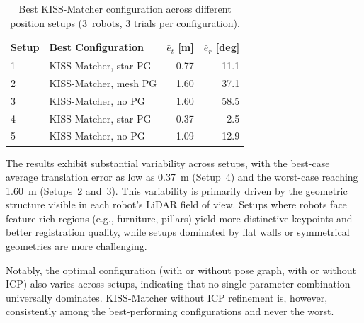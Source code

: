 \begin{table}[htbp]
    \centering
    \caption{Best KISS-Matcher configuration across different position
             setups (3~robots, 3 trials per configuration).}
    \label{tab:cross_setup}
    \begin{tabular}{l l r r}
        \toprule
        \textbf{Setup}
            & \textbf{Best Configuration}
            & $\bar{e}_t$ [m]
            & $\bar{e}_r$ [deg] \\
        \midrule
        1 & KISS-Matcher, star PG      & 0.77  & 11.1 \\
        2 & KISS-Matcher, mesh PG      & 1.60  & 37.1 \\
        3 & KISS-Matcher, no PG        & 1.60  & 58.5 \\
        4 & KISS-Matcher, star PG      & 0.37  &  2.5 \\
        5 & KISS-Matcher, no PG        & 1.09  & 12.9 \\
        \bottomrule
    \end{tabular}
\end{table}

The results exhibit substantial variability across setups, with
the best-case average translation error as low as \SI{0.37}{\metre}
(Setup~4) and the worst-case reaching \SI{1.60}{\metre}
(Setups~2 and~3).
This variability is primarily driven by the geometric structure
visible in each robot's LiDAR field of view.
Setups where robots face feature-rich regions (e.g., furniture,
pillars) yield more distinctive keypoints and better registration
quality, while setups dominated by flat walls or symmetrical
geometries are more challenging.

Notably, the optimal configuration (with or without pose graph,
with or without ICP) also varies across setups, indicating that
no single parameter combination universally dominates.
KISS-Matcher without ICP refinement is, however, consistently
among the best-performing configurations and never the worst.



